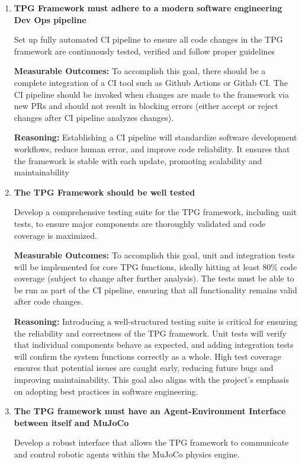 \documentclass{article}
\begin{document}
\begin{enumerate} [leftmargin=*]
    \item \textbf{TPG Framework must adhere to a modern software engineering Dev Ops pipeline}
    
    Set up fully automated CI pipeline to ensure all code changes in the TPG framework are continuously tested, verified and follow proper guidelines


\textbf{Measurable Outcomes: 
} To accomplish this goal, there should be a complete integration of a CI tool such as Github Actions or Gitlab CI. The CI pipeline should be invoked when changes are made to the framework via new PRs and should not result in blocking errors (either accept or reject changes after CI pipeline analyzes changes). 

\textbf{Reasoning: } Establishing a CI pipeline will standardize software development workflows, reduce human error, and improve code reliability. It ensures that the framework is stable with each update, promoting scalability and maintainability

\item \textbf{ The TPG Framework should be well tested}

Develop a comprehensive testing suite for the TPG framework, including unit tests, to ensure major components are thoroughly validated and code coverage is maximized.

\textbf{Measurable Outcomes:
}To accomplish this goal, unit and integration tests will be implemented for core TPG functions, ideally hitting at least 80\% code coverage (subject to change after further analysis). The tests must be able to be run as part of the CI pipeline, ensuring that all functionality remains valid after code changes.


\textbf{Reasoning:} Introducing a well-structured testing suite is critical for ensuring the reliability and correctness of the TPG framework. Unit tests will verify that individual components behave as expected, and adding integration tests will confirm the system functions correctly as a whole. High test coverage ensures that potential issues are caught early, reducing future bugs and improving maintainability. This goal also aligns with the project’s emphasis on adopting best practices in software engineering.

\item \textbf{The TPG framework must have an Agent-Environment Interface between itself and MuJoCo}

Develop a robust interface that allows the TPG framework to communicate and control robotic agents within the MuJoCo physics engine.


\end{enumerate}
\end{document}
